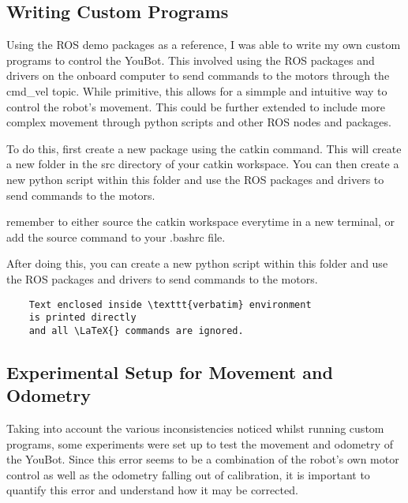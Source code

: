 \documentclass[a4paper, 12pt]{article}
\newif\ifshownotes
\newcommand{\notes}[1]{\ifshownotes\textcolor{blue}{#1}\fi}
\begin{document}
    \pagebreak

    \subsection{Writing Custom Programs}

    Using the ROS demo packages as a reference, I was able to write my own custom programs to control the YouBot. This involved using the ROS packages and drivers on the onboard computer to send commands to the motors through the \/cmd\_vel topic. While primitive, this allows for a simmple and intuitive way to control the robot's movement. This could be further extended to include more complex movement through python scripts and other ROS nodes and packages.

    To do this, first create a new package using the catkin command. This will create a new folder in the src directory of your catkin workspace. You can then create a new python script within this folder and use the ROS packages and drivers to send commands to the motors.

    remember to either source the catkin workspace everytime in a new terminal, or add the source command to your .bashrc file.

    After doing this, you can create a new python script within this folder and use the ROS packages and drivers to send commands to the motors. 

    

    \begin{verbatim}
    Text enclosed inside \texttt{verbatim} environment 
    is printed directly 
    and all \LaTeX{} commands are ignored.
    \end{verbatim}


   
    \pagebreak

    \subsection{Experimental Setup for Movement and Odometry}

    \notes{here, ill discuss the experimental setup for testing movement and odometry.  this should include the two experiments of moving linearly and rotating, and discuss how error is calculated. probably discuss negative feedback and PID control as well, random, percentage, consistent error, etc.}

    Taking into account the various inconsistencies noticed whilst running custom programs, some experiments were set up to test the movement and odometry of the YouBot. Since this error seems to be a combination of the robot's own motor control as well as the odometry falling out of calibration, it is important to quantify this error and understand how it may be corrected. 
\end{document}
